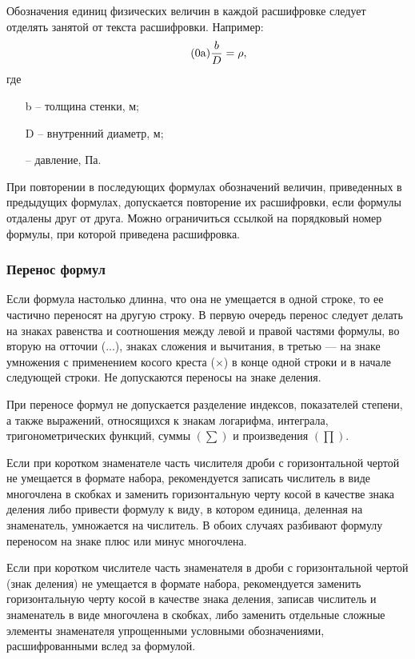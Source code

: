 Обозначения единиц физических величин в каждой расшифровке следует отделять занятой от текста расшифровки.
\needspace{5cm}
Например: 
\[
\tag{{\theequation}a}
\frac{b}{D} = \rho, 
\]
где
\begin{enumerate}
    \item [b] -- толщина стенки, м;
    \item [D] -- внутренний диаметр, м;
    \item [\rho] -- давление, Па.
\end{enumerate}

При повторении в последующих формулах обозначений величин, приведенных в предыдущих формулах, допускается повторение их расшиф­ровки, если формулы отдалены друг от друга. Можно ограничиться ссылкой на порядковый номер формулы, при которой приведена расшифровка.

\subsubsection{Перенос формул}

Если формула настолько длинна, что она не умещается в одной строке, то ее частично переносят на другую строку. В первую очередь перенос следует делать на знаках равенства и соотношения между левой и правой частями формулы, во вторую на отточии (...), зна­ках сложения и вычитания, в третью — на знаке умножения с применением косого креста (\(\times \)) в конце одной строки и в начале следующей стро­ки. Не допускаются переносы на знаке деления.

При переносе формул не допускается разделение индексов, показа­телей степени, а также выражений, относящихся к знакам логарифма, инте­грала, тригонометрических функций, суммы \( (  \sum ) \) и произведения \( (\prod)\).

Если при коротком знаменателе часть числителя дроби с горизон­тальной чертой не умещается в формате набора, рекомендуется записать чис­литель в виде многочлена в скобках и заменить горизонтальную черту косой в качестве знака деления либо привести формулу к виду, в котором единица, деленная на знаменатель, умножается на числитель. В обоих случаях раз­бивают формулу переносом на знаке плюс или минус многочлена.

Если при коротком числителе часть знаменателя в дроби с горизон­тальной чертой (знак деления) не умещается в формате набора, рекомендуется заменить горизонтальную черту косой в качестве знака деления, записав числитель и знаменатель в виде многочлена в скобках, либо заменить отдель­ные сложные элементы знаменателя упрощенными условными обозначениями, расшифрованными вслед за формулой.

